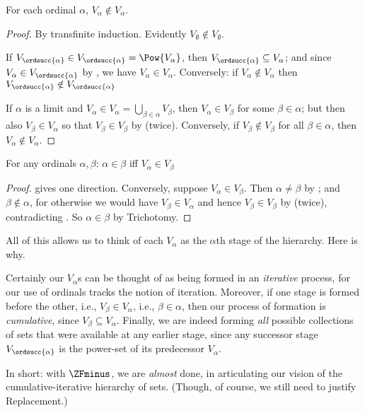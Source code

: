 \documentclass[../../../include/open-logic-section]{subfiles}
\begin{document}
\begin{lem}
For each ordinal $\alpha$, $V_\alpha \notin V_\alpha$.
\end{lem}

\begin{proof}
By transfinite induction. Evidently $V_\emptyset \notin V_\emptyset$. 

If $V_{\ordsucc{\alpha}} \in V_{\ordsucc{\alpha}} = \Pow{V_\alpha}$,
then $V_{\ordsucc{\alpha}} \subseteq V_\alpha$; and since $V_\alpha
\in V_{\ordsucc{\alpha}}$ by , we have
$V_\alpha \in V_\alpha$. Conversely: if $V_\alpha \notin V_\alpha$
then $V_{\ordsucc{\alpha}} \notin V_{\ordsucc{\alpha}}$

If $\alpha$ is a limit and $V_\alpha \in V_\alpha = \bigcup_{\beta \in
\alpha}V_\beta$, then $V_\alpha \in V_\beta$ for some $\beta \in
\alpha$; but then also $V_\beta \in V_\alpha$ so that $V_\beta \in
V_\beta$ by  (twice). Conversely, if $V_\beta
\notin V_\beta$ for all $\beta \in \alpha$, then $V_\alpha \notin
V_\alpha$.
\end{proof}

\begin{cor}
For any ordinals $\alpha, \beta$: $\alpha \in \beta$ iff $V_\alpha \in V_\beta$
\end{cor}

\begin{proof}
 gives one direction. Conversely, suppose $V_\alpha \in V_\beta$. Then $\alpha \neq \beta$ by ; and $\beta \notin \alpha$, for otherwise we would have $V_\beta \in V_\alpha$ and hence $V_\beta \in V_\beta$ by  (twice), contradicting . So $\alpha \in \beta$ by Trichotomy.
\end{proof}
\noindent
All of this allows us to think of each $V_\alpha$ as the $\alpha$th
stage of the hierarchy. Here is why.

Certainly our $V_\alpha$s can be thought of as being formed in an
\emph{iterative} process, for our use of ordinals tracks the notion of
iteration. Moreover, if one stage is formed before the other, i.e.,
$V_\beta \in V_\alpha$, i.e., $\beta \in \alpha$, then our process of
formation is \emph{cumulative}, since $V_\beta \subseteq V_\alpha$.
Finally, we are indeed forming \emph{all} possible collections of sets
that were available at any earlier stage, since any successor stage
$V_{\ordsucc{\alpha}}$ is the power-set of its predecessor $V_\alpha$.

In short: with $\ZFminus$, we are \emph{almost} done, in articulating
our vision of the cumulative-iterative hierarchy of sets. (Though, of
course, we still need to justify Replacement.)
\end{document}

